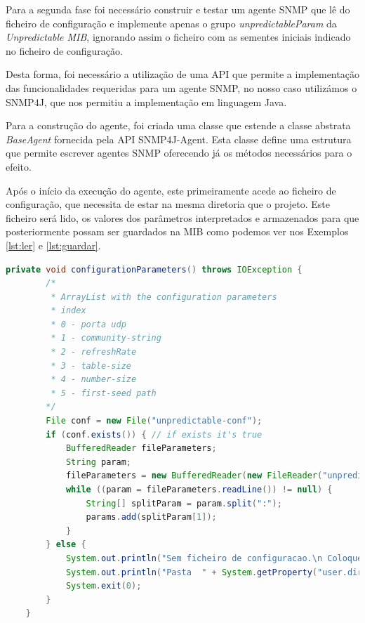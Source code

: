 \documentclass[../momento_1.tex]{subfiles}
\begin{document}
Para a segunda fase foi necessário construir e testar um agente SNMP que lê do ficheiro de
configuração e implemente apenas o grupo \textit{unpredictableParam} da \textit{Unpredictable MIB}, ignorando assim o ficheiro com as sementes iniciais indicado no ficheiro de configuração.\par

Desta forma, foi necessário a utilização de uma API que permite a implementação das funcionalidades requeridas para um agente SNMP, no nosso caso utilizámos o SNMP4J, que nos permitiu a implementação em linguagem Java.\par 

Para a construção do agente, foi criada uma classe que estende a classe abstrata \textit{BaseAgent} fornecida pela API SNMP4J-Agent. Esta classe define uma estrutura que permite escrever agentes SNMP oferecendo já os métodos necessários para o efeito. \par 

Após o início da execução do agente, este primeiramente acede ao ficheiro de configuração, que necessita de estar na mesma diretoria que o projeto. Este ficheiro será lido, os valores dos parâmetros interpretados e armazenados para que posteriormente possam ser guardados na MIB como podemos ver nos Exemplos \ref{lst:ler} e \ref{lst:guardar}.\\

{
\begin{lstlisting}[caption={Método utilizado para ler do ficheiro de configuração.},label={lst:ler},language=JAVA]
	private void configurationParameters() throws IOException {
        /*
         * ArrayList with the configuration parameters
         * index
         * 0 - porta udp
         * 1 - community-string
         * 2 - refreshRate
         * 3 - table-size
         * 4 - number-size
         * 5 - first-seed path
        */
        File conf = new File("unpredictable-conf");
        if (conf.exists()) { // if exists it's true
            BufferedReader fileParameters;
            String param;
            fileParameters = new BufferedReader(new FileReader("unpredictable-conf"));
            while ((param = fileParameters.readLine()) != null) {
                String[] splitParam = param.split(":");
                params.add(splitParam[1]);
            }
        } else {
            System.out.println("Sem ficheiro de configuracao.\n Coloque na pasta respectiva!");
            System.out.println("Pasta  " + System.getProperty("user.dir"));
            System.exit(0);
        }
    }
\end{lstlisting}}
\end{document}
